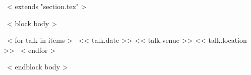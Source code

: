 ~< extends "section.tex" >~

~< block body >~
\begin{entrylistTwo}
~< for talk in items >~
\entryTwo
{<< talk.date >>}
{<< talk.venue >>}
{<< talk.location >>}
~< endfor >~
\end{entrylistTwo}
~< endblock body >~

